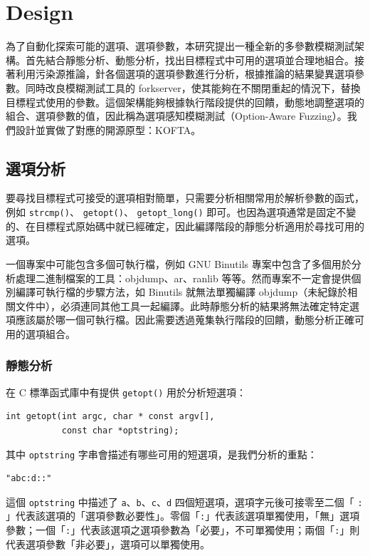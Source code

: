 \chapter{Design}
\label{ch:design}

為了自動化探索可能的選項、選項參數，本研究提出一種全新的多參數模糊測試架構。首先結合靜態分析、動態分析，找出目標程式中可用的選項並合理地組合。接著利用污染源推論，針各個選項的選項參數進行分析，根據推論的結果變異選項參數。同時改良模糊測試工具的 forkserver，使其能夠在不關閉重起的情況下，替換目標程式使用的參數。這個架構能夠根據執行階段提供的回饋，動態地調整選項的組合、選項參數的值，因此稱為選項感知模糊測試（Option-Aware Fuzzing）。我們設計並實做了對應的開源原型：KOFTA。

\section{選項分析}

要尋找目標程式可接受的選項相對簡單，只需要分析相關常用於解析參數的函式，例如 \texttt{strcmp()}、 \texttt{getopt()}、 \texttt{getopt\_long()} 即可。也因為選項通常是固定不變的、在目標程式原始碼中就已經確定，因此編譯階段的靜態分析適用於尋找可用的選項。

一個專案中可能包含多個可執行檔，例如 GNU Binutils 專案中包含了多個用於分析處理二進制檔案的工具：objdump、ar、ranlib 等等。然而專案不一定會提供個別編譯可執行檔的步驟方法，如 Binutils 就無法單獨編譯 objdump（未紀錄於相關文件中），必須連同其他工具一起編譯。此時靜態分析的結果將無法確定特定選項應該屬於哪一個可執行檔。因此需要透過蒐集執行階段的回饋，動態分析正確可用的選項組合。

\subsection{靜態分析}
\label{subsec:optana-static}

在 C 標準函式庫中有提供 \texttt{getopt()} 用於分析短選項：

\begin{lstlisting}[numbers=none]
int getopt(int argc, char * const argv[],
           const char *optstring);
\end{lstlisting}

其中 \texttt{optstring} 字串會描述有哪些可用的短選項，是我們分析的重點：

\begin{lstlisting}[numbers=none]
"abc:d::"
\end{lstlisting}

這個 \texttt{optstring} 中描述了 \texttt{a}、\texttt{b}、\texttt{c}、\texttt{d} 四個短選項，選項字元後可接零至二個「 \texttt{:} 」代表該選項的「選項參數必要性」。零個「\texttt{:}」代表該選項單獨使用，「無」選項參數；一個「\texttt{:}」代表該選項之選項參數為「必要」，不可單獨使用；兩個「\texttt{:}」則代表選項參數「非必要」，選項可以單獨使用。

